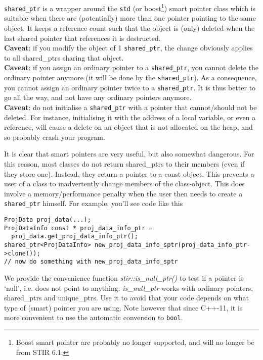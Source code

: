 \documentclass{article}
\begin{document}
\texttt{shared\_ptr} is a wrapper around the \texttt{std} (or boost\footnote{Boost smart pointer are probably no longer supported, and will no longer be from STIR 6.1.}) smart pointer class which 
is suitable when there are (potentially) more than one pointer 
pointing to the same object. It keeps a reference count such 
that the object is (only) deleted when the last shared pointer 
that references it is destructed. \\
\textbf{Caveat}: if you modify the object of 1 \texttt{shared\_ptr}, the change 
obviously applies to all shared\_ptrs sharing that object.\\
\textbf{Caveat}: if you assign an ordinary pointer to a \texttt{shared\_ptr}, you 
cannot delete the ordinary pointer anymore (it will be done by 
the \texttt{shared\_ptr}). As a consequence, you cannot assign an ordinary 
pointer twice to a \texttt{shared\_ptr}. It is thus better to go all the 
way, and not have any ordinary pointers anymore.\\
\textbf{Caveat}: do not initialise a \texttt{shared\_ptr} with a pointer that cannot/should 
not be deleted. For instance, initialising it with the address 
of a local variable, or even a reference, will cause a delete 
on an object that is not allocated on the heap, and so probably 
crash your program.

It is clear that smart pointers are very useful, but also somewhat 
dangerous. For this reason, most classes do not return shared\_ptrs 
to their members (even if they store one). Instead, they return 
a pointer to a const object. This prevents a user of a class 
to inadvertently change members of the class-object. This does 
involve a memory/performance penalty when the user then needs to create 
a \texttt{shared\_ptr} himself. For example, you'll see code like this

\begin{verbatim}
ProjData proj_data(...);
ProjDataInfo const * proj_data_info_ptr = 
  proj_data.get_proj_data_info_ptr();
shared_ptr<ProjDataInfo> new_proj_data_info_sptr(proj_data_info_ptr->clone());
// now do something with new_proj_data_info_sptr
\end{verbatim}


We provide the convenience function \textit{stir::is\_null\_ptr()} 
to test if a pointer is `null', i.e. does not point to anything. \textit{is\_null\_ptr} 
works with ordinary pointers, shared\_ptrs and unique\_ptrs. Use 
it to avoid that your code depends on what type of (smart) pointer 
you are using. Note however that since C++-11, it is more convenient to use the
automatic conversion to \texttt{bool}.
\end{document}
